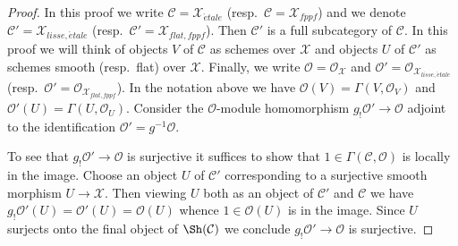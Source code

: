 \begin{proof}
In this proof we write
$\mathcal{C} = \mathcal{X}_{\acute{e}tale}$
(resp.\ $\mathcal{C} = \mathcal{X}_{fppf}$)
and we denote
$\mathcal{C}' = \mathcal{X}_{lisse,\acute{e}tale}$
(resp.\ $\mathcal{C}' = \mathcal{X}_{flat, fppf}$).
Then $\mathcal{C}'$ is a full subcategory of $\mathcal{C}$.
In this proof we will think of objects $V$ of $\mathcal{C}$
as schemes over $\mathcal{X}$ and objects $U$ of $\mathcal{C}'$
as schemes smooth (resp.\ flat) over $\mathcal{X}$.
Finally, we write $\mathcal{O} = \mathcal{O}_\mathcal{X}$
and $\mathcal{O}' = \mathcal{O}_{\mathcal{X}_{lisse,\acute{e}tale}}$
(resp.\ $\mathcal{O}' = \mathcal{O}_{\mathcal{X}_{flat,fppf}}$).
In the notation above we have $\mathcal{O}(V) = \Gamma(V, \mathcal{O}_V)$
and $\mathcal{O}'(U) = \Gamma(U, \mathcal{O}_U)$.
Consider the $\mathcal{O}$-module homomorphism
$g_!\mathcal{O}' \to \mathcal{O}$
adjoint to the identification $\mathcal{O}' = g^{-1}\mathcal{O}$.

\medskip\noindent
To see that $g_!\mathcal{O}' \to \mathcal{O}$ is surjective it
suffices to show that $1 \in \Gamma(\mathcal{C}, \mathcal{O})$ is
locally in the image. Choose an object $U$ of $\mathcal{C}'$
corresponding to a surjective smooth morphism $U \to \mathcal{X}$.
Then viewing $U$ both as an object of $\mathcal{C}'$ and $\mathcal{C}$
we have $g_!\mathcal{O}'(U) = \mathcal{O}'(U) = \mathcal{O}(U)$ whence
$1 \in \mathcal{O}(U)$ is in the image. Since $U$ surjects onto the
final object of $\Sh(\mathcal{C})$ we conclude
$g_!\mathcal{O}' \to \mathcal{O}$ is surjective.


\end{proof}
